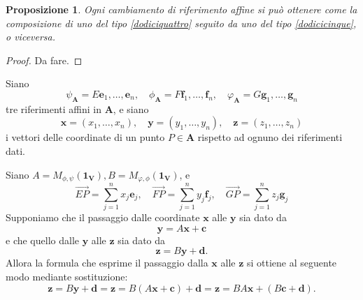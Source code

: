 \documentclass{article}
\theoremstyle{plain}
\newtheorem{prop}[thm]{Proposizione}
\theoremstyle{definition}
\theoremstyle{remark}
\begin{document}
\vspace{10pt}

\begin{bxthm}
\begin{prop}
Ogni cambiamento di riferimento affine si può ottenere come la composizione di uno del tipo \ref{dodiciquattro} seguito da uno del tipo \ref{dodicicinque}, o viceversa.     
\end{prop}
\end{bxthm}
\begin{proof}
    Da fare.
\end{proof}

\vspace{10pt}

Siano 
\[ \psi_\mathbf{A}=E\mathbf{e}_1, \dots, \mathbf{e}_n,\quad \phi_\mathbf{A}=F\mathbf{f}_1, \dots, \mathbf{f}_n,\quad \varphi_\mathbf{A}=G\mathbf{g}_1, \dots, \mathbf{g}_n \]
tre riferimenti affini in $\mathbf{A}$, e siano 
\[ \mathbf{x} = (x_1, \dots, x_n),\quad \mathbf{y} = (y_1, \dots, y_n),\quad \mathbf{z} = (z_1, \dots, z_n) \]
i vettori delle coordinate di un punto $P \in \mathbf{A}$ rispetto ad ognuno dei riferimenti dati. 

\vspace{10pt}

\begin{center}
\end{center}

\vspace{10pt}

Siano $A=M_{\phi,\psi}(\mathbf{1_V}), B=M_{\varphi,\phi}(\mathbf{1_V})$, e
\[\overrightarrow{EP}=\sum_{j=1}^{n}x_j\mathbf{e}_j,\quad\overrightarrow{FP}=\sum_{j=1}^{n}y_j\mathbf{f}_j,\quad\overrightarrow{GP}=\sum_{j=1}^{n}z_j\mathbf{g}_j\]
Supponiamo che il passaggio dalle coordinate $\mathbf{x}$ alle $\mathbf{y}$ sia dato da 
\[\mathbf{y}=A\mathbf{x}+\mathbf{c}\]
e che quello dalle $\mathbf{y}$ alle $\mathbf{z}$ sia dato da
\[\mathbf{z}=B\mathbf{y}+\mathbf{d}.\]
Allora la formula che esprime il passaggio dalla $\mathbf{x}$ alle $\mathbf{z}$ si ottiene al seguente modo mediante sostituzione:
\[\mathbf{z}=B\mathbf{y}+\mathbf{d} = \mathbf{z}=B(A\mathbf{x}+\mathbf{c})+\mathbf{d}= \mathbf{z}=BA\mathbf{x}+(B\mathbf{c}+\mathbf{d}).\]
\end{document}
